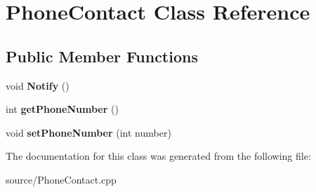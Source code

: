 \hypertarget{classPhoneContact}{}\section{Phone\+Contact Class Reference}
\label{classPhoneContact}
\subsection*{Public Member Functions}
\begin{DoxyCompactItemize}
\item 
\mbox{\label{classPhoneContact_a6ed76ca948ad5dfb6a37bc2e025ff4e3}} 
void {\bfseries Notify} ()
\item 
\mbox{\label{classPhoneContact_a4802927b7402bad80ece9256a532e635}} 
int {\bfseries get\+Phone\+Number} ()
\item 
\mbox{\label{classPhoneContact_a1a279ff208a41a6c4d6ce611f0e9b42d}} 
void {\bfseries set\+Phone\+Number} (int number)
\end{DoxyCompactItemize}


The documentation for this class was generated from the following file\+:\begin{DoxyCompactItemize}
\item 
source/Phone\+Contact.\+cpp\end{DoxyCompactItemize}
